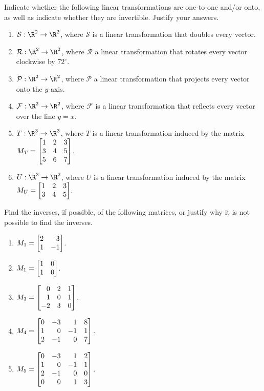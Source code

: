 \begin{exercises}
	\begin{problist}
		\prob  Indicate whether the following linear transformations are one-to-one and/or onto, as well as indicate whether they are invertible. Justify your answers.
		\begin{enumerate}
			\item   $\mathcal S:\R^2\to\R^2$, where $\mathcal S$ is a linear transformation that doubles every vector.
			\item   $\mathcal R:\R^2\to\R^2$, where $\mathcal R$ a linear transformation that rotates every vector clockwise by $72^\circ$.
			\item   $\mathcal P:\R^2\to\R^2$, where $\mathcal P$ a linear transformation that projects every vector onto the $y$-axis.
			\item   $\mathcal F:\R^2\to\R^2$, where $\mathcal F$ is a linear transformation that reflects every vector over the line $y=x$.
			\item   $T:\R^3\to\R^3$, where $T$ is a linear transformation induced by the matrix $M_T = \mat{1&2&3\\3&4&5\\5&6&7}$.
			\item   $U:\R^3\to\R^2$, where $U$ is a linear transformation induced by the matrix $M_U = \mat{1&2&3\\3&4&5}$.
		\end{enumerate}
		
		\prob Find the inverses, if possible, of the following matrices, or justify why it is not possible to find the inverses.
		    \begin{enumerate}
		        \item   $M_1 = \mat{2&3\\1&-1}$.
		        \item   $M_1 = \mat{1&0\\1&0}$.
		        \item   $M_3 = \mat{0&2&1\\1&0&1\\-2&3&0}$.
		        \item   $M_4 = \mat{0&-3&1&8\\1&0&-1&1\\2&-1&0&7}$.
		        \item   $M_5 = \mat{0&-3&1&2\\1&0&-1&1\\2&-1&0&0\\0&0&1&3}$.
		    \end{enumerate}
		

\end{problist}
\end{exercises}
